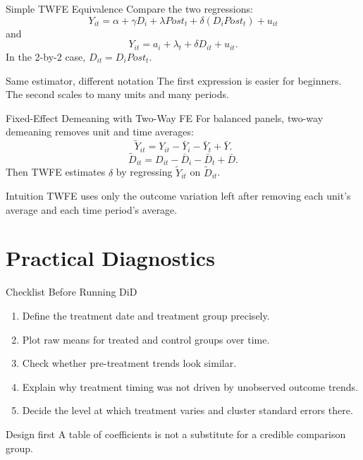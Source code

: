 \documentclass[11pt,aspectratio=169]{beamer}
\begin{document}
\begin{frame}{Simple TWFE Equivalence}
  Compare the two regressions:
  \[
    Y_{it}
    =
    \alpha+\gamma D_i+\lambda Post_t+\delta(D_iPost_t)+u_{it}
  \]
  and
  \[
    Y_{it}
    =
    a_i+\lambda_t+\delta D_{it}+u_{it}.
  \]
  In the 2-by-2 case, \(D_{it}=D_iPost_t\).
  \vspace{0.3em}
  \begin{block}{Same estimator, different notation}
    The first expression is easier for beginners. The second scales to many units and many periods.
  \end{block}
\end{frame}

\begin{frame}{Fixed-Effect Demeaning with Two-Way FE}
  For balanced panels, two-way demeaning removes unit and time averages:
  \[
    \tilde Y_{it}
    =
    Y_{it}-\bar Y_i-\bar Y_t+\bar Y.
  \]
  \[
    \tilde D_{it}
    =
    D_{it}-\bar D_i-\bar D_t+\bar D.
  \]
  Then TWFE estimates \(\delta\) by regressing \(\tilde Y_{it}\) on \(\tilde D_{it}\).
  \begin{block}{Intuition}
    TWFE uses only the outcome variation left after removing each unit's average and each time period's average.
  \end{block}
\end{frame}

\section{Practical Diagnostics}

\begin{frame}{Checklist Before Running DiD}
  \begin{enumerate}
    \item Define the treatment date and treatment group precisely.
    \item Plot raw means for treated and control groups over time.
    \item Check whether pre-treatment trends look similar.
    \item Explain why treatment timing was not driven by unobserved outcome trends.
    \item Decide the level at which treatment varies and cluster standard errors there.
  \end{enumerate}
  \begin{block}{Design first}
    A table of coefficients is not a substitute for a credible comparison group.
  \end{block}
\end{frame}
\end{document}
